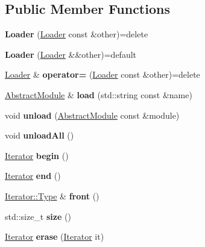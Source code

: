 \subsection*{Public Member Functions}
\begin{DoxyCompactItemize}
\item 
\mbox{\label{classzany_1_1_loader_a9a7b5970ad03ca3cb0274b11630eb1f3}} 
{\bfseries Loader} (\hyperlink{classzany_1_1_loader}{Loader} const \&other)=delete
\item 
\mbox{\label{classzany_1_1_loader_a2e776001256e8a487a4574a54606522a}} 
{\bfseries Loader} (\hyperlink{classzany_1_1_loader}{Loader} \&\&other)=default
\item 
\mbox{\label{classzany_1_1_loader_aacae35c0fae50ceac29ded3db0670e8c}} 
\hyperlink{classzany_1_1_loader}{Loader} \& {\bfseries operator=} (\hyperlink{classzany_1_1_loader}{Loader} const \&other)=delete
\item 
\mbox{\label{classzany_1_1_loader_ae87e84cefc19b84970e3a06df9b06835}} 
\hyperlink{classzany_1_1_loader_1_1_abstract_module}{Abstract\+Module} \& {\bfseries load} (std\+::string const \&name)
\item 
\mbox{\label{classzany_1_1_loader_a6ac1448b229d6e3b8670e1e83c15ab5d}} 
void {\bfseries unload} (\hyperlink{classzany_1_1_loader_1_1_abstract_module}{Abstract\+Module} const \&module)
\item 
\mbox{\label{classzany_1_1_loader_af7ce8b94011fe49bcf93411379355dc6}} 
void {\bfseries unload\+All} ()
\item 
\mbox{\label{classzany_1_1_loader_a716597a37bfcaf4410e9d734e23912a2}} 
\hyperlink{classzany_1_1_loader_1_1_iterator}{Iterator} {\bfseries begin} ()
\item 
\mbox{\label{classzany_1_1_loader_a39b1ed67c494b444560f7a83520212cf}} 
\hyperlink{classzany_1_1_loader_1_1_iterator}{Iterator} {\bfseries end} ()
\item 
\mbox{\label{classzany_1_1_loader_ad726922fae4fb06e2689dac4e61a900b}} 
\hyperlink{classzany_1_1_loader_1_1_abstract_module}{Iterator\+::\+Type} \& {\bfseries front} ()
\item 
\mbox{\label{classzany_1_1_loader_a53eb662a71961e47a1502c57a1505721}} 
std\+::size\+\_\+t {\bfseries size} ()
\item 
\mbox{\label{classzany_1_1_loader_ae5264c721a9ba9e94abf26cc9ac8c3d6}} 
\hyperlink{classzany_1_1_loader_1_1_iterator}{Iterator} {\bfseries erase} (\hyperlink{classzany_1_1_loader_1_1_iterator}{Iterator} it)
\end{DoxyCompactItemize}


